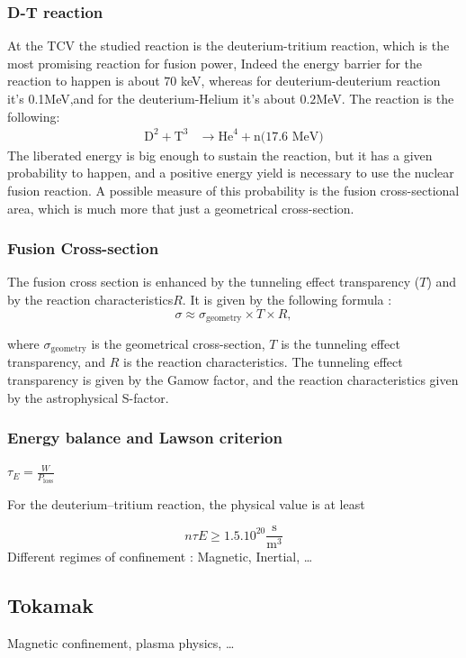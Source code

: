 \documentclass[11pt,a4paper]{report}
\begin{document}
\begin{multicols}{2}
    \subsubsection{D-T reaction}
    At the TCV the studied reaction is the deuterium-tritium reaction, which is the most promising reaction for fusion power, Indeed the energy barrier for the reaction to happen is about $70$ keV, whereas for deuterium-deuterium reaction it's $0.$1MeV,and for the deuterium-Helium it's about $0.2$MeV. The reaction is the following:
    \begin{align*}
        \text{D}^2 + \text{T}^3 & \rightarrow \text{He}^4 + \text{n(17.6 MeV)}
    \end{align*}
    The liberated energy is big enough to sustain the reaction, but it has a given probability to happen, and a positive energy yield is necessary to use the nuclear fusion reaction.
    A possible measure of this probability is the fusion cross-sectional area, which is much more that just a geometrical cross-section.
    \subsubsection{Fusion Cross-section}
    The fusion cross section is enhanced by the tunneling effect transparency ($T$) and by the reaction characteristics$R$. It is given by the following formula :
    $$\sigma \approx \sigma _{\text{geometry}}\times T\times R,$$

    where $\sigma _{\text{geometry}}$ is the geometrical cross-section, $T$ is the tunneling effect transparency, and $R$ is the reaction characteristics. The tunneling effect transparency is given by the Gamow factor, and the reaction characteristics given by the astrophysical S-factor.
    \subsubsection{Energy balance and Lawson criterion}
    $ \tau _{E}={\frac {W}{P_{\mathrm {loss} }}}$

    For the deuterium–tritium reaction, the physical value is at least

    $$n \tau E \ge 1.5.10^{20}{\frac {\mathrm {s} }{\mathrm {m} ^{3}}}$$
    Different regimes of confinement : Magnetic, Inertial, \dots
    \subsection{Tokamak}
    Magnetic confinement, plasma physics, \dots


\end{multicols}
\end{document}
